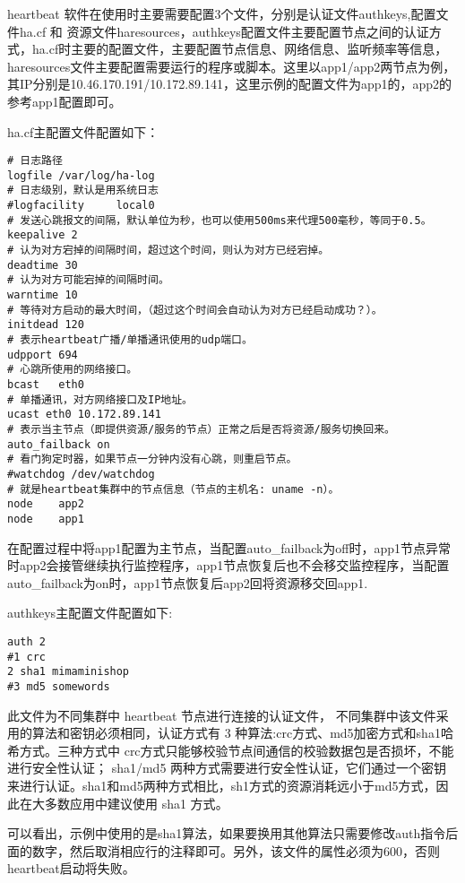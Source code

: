 \begin{enumerate}
heartbeat 软件在使用时主要需要配置3个文件，分别是认证文件authkeys,配置文件ha.cf 和 资源文件haresources，authkeys配置文件主要配置节点之间的认证方式，ha.cf时主要的配置文件，主要配置节点信息、网络信息、监听频率等信息，haresources文件主要配置需要运行的程序或脚本。这里以app1/app2两节点为例，其IP分别是10.46.170.191/10.172.89.141，这里示例的配置文件为app1的，app2的参考app1配置即可。

ha.cf主配置文件配置如下：
\begin{lstlisting}[numbers=none]
# 日志路径
logfile /var/log/ha-log
# 日志级别，默认是用系统日志
#logfacility     local0
# 发送心跳报文的间隔，默认单位为秒，也可以使用500ms来代理500毫秒，等同于0.5。
keepalive 2
# 认为对方宕掉的间隔时间，超过这个时间，则认为对方已经宕掉。
deadtime 30
# 认为对方可能宕掉的间隔时间。
warntime 10
# 等待对方启动的最大时间，（超过这个时间会自动认为对方已经启动成功？）。
initdead 120
# 表示heartbeat广播/单播通讯使用的udp端口。
udpport 694
# 心跳所使用的网络接口。
bcast   eth0
# 单播通讯，对方网络接口及IP地址。
ucast eth0 10.172.89.141
# 表示当主节点（即提供资源/服务的节点）正常之后是否将资源/服务切换回来。
auto_failback on
# 看门狗定时器，如果节点一分钟内没有心跳，则重启节点。
#watchdog /dev/watchdog
# 就是heartbeat集群中的节点信息（节点的主机名: uname -n）。
node    app2
node    app1
\end{lstlisting}
在配置过程中将app1配置为主节点，当配置auto\_failback为off时，app1节点异常时app2会接管继续执行监控程序，app1节点恢复后也不会移交监控程序，当配置auto\_failback为on时，app1节点恢复后app2回将资源移交回app1.

authkeys主配置文件配置如下:
\begin{lstlisting}[numbers=none]
auth 2
#1 crc
2 sha1 mimaminishop
#3 md5 somewords
\end{lstlisting}
此文件为不同集群中 heartbeat 节点进行连接的认证文件， 不同集群中该文件采用的算法和密钥必须相同，认证方式有 3 种算法:crc方式、md5加密方式和sha1哈希方式。三种方式中 crc方式只能够校验节点间通信的校验数据包是否损坏，不能进行安全性认证； sha1/md5 两种方式需要进行安全性认证，它们通过一个密钥来进行认证。sha1和md5两种方式相比，sh1方式的资源消耗远小于md5方式，因此在大多数应用中建议使用 sha1 方式\cite{heartbeat配置说明}。

可以看出，示例中使用的是sha1算法，如果要换用其他算法只需要修改auth指令后面的数字，然后取消相应行的注释即可。另外，该文件的属性必须为600，否则heartbeat启动将失败。


\end{enumerate}
